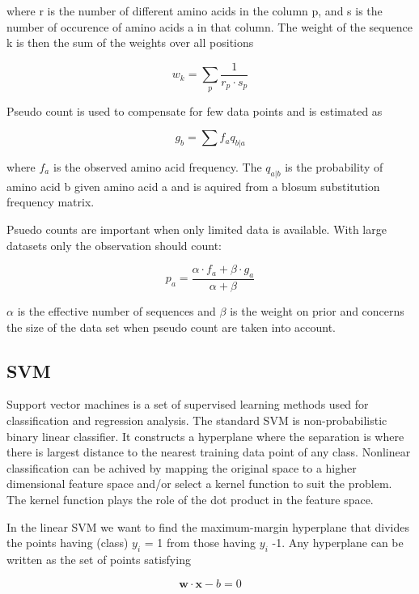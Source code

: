 where r is the number of different amino acids in the column p, and s is the number of occurence of amino acids a in that column. The weight of the sequence k is then the sum of the weights over all positions

\begin{equation}
w_{k} = \sum_{p}{\frac{1}{r_p \cdot s_p}}
\end{equation}

Pseudo count is used to compensate for few data points and is estimated as

\begin{equation}
g_b = \sum{f_a}{q_{b|a}}
\end{equation}

where $f_a$ is the observed amino acid frequency. The $q_{a|b}$ is the probability of amino acid b given amino acid a and is aquired from a blosum substitution frequency matrix.

Psuedo counts are important when only limited data is available. With large datasets only the observation should count:

\begin{equation}
p_a = \frac{\alpha \cdot f_a + \beta \cdot g_a}{\alpha + \beta}
\end{equation}

$\alpha$ is the effective number of sequences and $\beta$ is the weight on prior and concerns the size of the data set when pseudo count are taken into account.

\subsection*{SVM}
Support vector machines is a set of supervised learning methods used for classification and regression analysis. 
The standard SVM is non-probabilistic binary linear classifier. 
It constructs a hyperplane where the separation is where there is largest distance to the nearest training data point of any class. 
Nonlinear classification can be achived by  mapping the original space to a higher dimensional feature space and/or select a kernel function to suit the problem. 
The kernel function plays the role of the dot product in the feature space.

In the linear SVM we want to find the maximum-margin hyperplane that divides the points having (class) $y_{i}$ = 1 from those having $y_i$  -1. Any hyperplane can be written as the set of points satisfying

\begin{equation}
\mathbf{w \cdot x} - b = 0
\end{equation}

